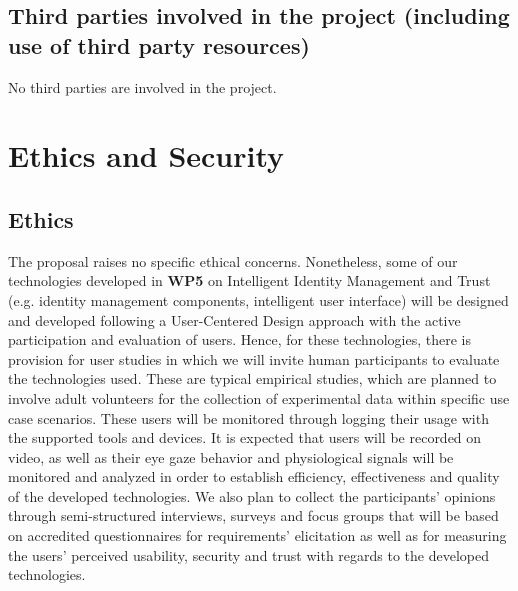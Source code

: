 \documentclass[a4paper,11pt]{article}
\begin{document}
\subsection{Third parties involved in the project (including use of third party resources)}

No third parties are involved in the project.


\newpage

\section{Ethics and Security}

\subsection{Ethics}

The proposal raises no specific ethical concerns. Nonetheless, some of our technologies developed in \textbf{WP5} on Intelligent Identity Management and Trust (e.g. identity management components, intelligent user interface) will be designed and developed following a User-Centered Design approach with the active participation and evaluation of users. Hence, for these technologies, there is provision for user studies in which we will invite human participants to evaluate the technologies used. These are typical empirical studies, which are planned to involve adult volunteers for the collection of experimental data within specific use case scenarios. 
These users will be monitored through logging their usage with the supported tools and devices. It is expected that users will be recorded on video, as well as their eye gaze behavior and physiological signals will be monitored and analyzed in order to establish efficiency, effectiveness and quality of the developed technologies. We also plan to collect the participants' opinions through semi-structured interviews, surveys and focus groups that will be based on accredited questionnaires for requirements' elicitation as well as for measuring the users’ perceived usability, security and trust with regards to the developed technologies.
\end{document}
